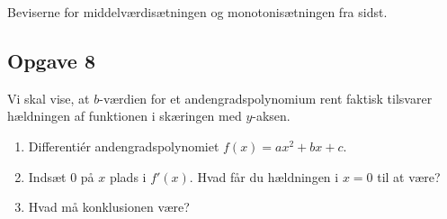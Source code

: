 Beviserne for middelværdisætningen og monotonisætningen fra sidst. 

\subsection*{Opgave 8}

Vi skal vise, at $b$-værdien for et andengradspolynomium rent faktisk tilsvarer hældningen af funktionen i skæringen med $y$-aksen. 

\begin{enumerate}[label=\roman*)]
	\item Differentiér andengradspolynomiet $f(x) = ax^2+bx+c$. 
	\item Indsæt $0$ på $x$ plads i $f'(x)$. Hvad får du hældningen i $x = 0$ til at være?
	\item Hvad må konklusionen være?
\end{enumerate}